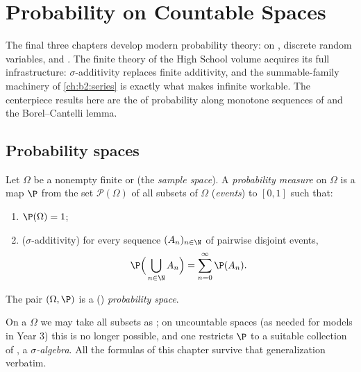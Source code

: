 \chapter{Probability on Countable Spaces}\label{ch:b2:proba}

The final three chapters develop modern probability theory:
 on  , discrete random variables, and . The
finite theory of the High School volume acquires its full
infrastructure: $\sigma$-additivity replaces finite additivity,
and the summable-family machinery of \cref{ch:b2:series} is
exactly what makes infinite  workable. The
centerpiece results here are the  of probability along
monotone sequences of  and the Borel--Cantelli lemma.

\section{Probability spaces}

\begin{definition}\label{def:b2:proba:space}
Let $\Omega$ be a nonempty finite or  (the
\emph{sample space}). A \emph{probability
measure} on $\Omega$ is
a map $\P$ from the set $\mathcal{P}(\Omega)$ of all subsets of
$\Omega$ (\emph{events}) to $[0, 1]$ such that:
\begin{enumerate}
\item $\P(\Omega) = 1$;
\item ($\sigma$-additivity) for every sequence $(A_n)_{n\in\N}$ of
pairwise disjoint events,
\[
\P\Bigl(\,\bigcup_{n \in \N} A_n\Bigr)
= \sum_{n=0}^{\infty} \P(A_n) .
\]
\end{enumerate}
The pair $(\Omega, \P)$ is a () \emph{probability
space}.
\end{definition}

\begin{remark}
On a  $\Omega$ we may take all subsets as ; on
uncountable spaces (as needed for  models in Year 3)
this is no longer possible, and one restricts $\P$ to a suitable
collection of , a \emph{$\sigma$-algebra}. All the formulas
of this chapter survive that generalization verbatim.
\end{remark}

